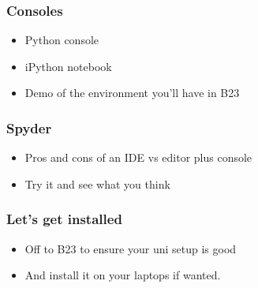 \documentclass{beamer}
\begin{document}
\begin{frame}
\frametitle{Consoles}
\begin{itemize}
\item Python console 
\item iPython notebook
\item Demo of the environment you'll have in B23
\end{itemize}
\end{frame}


\begin{frame}
\frametitle{Spyder}
\begin{itemize}
\item Pros and cons of an IDE vs editor plus console
\item Try it and see what you think
\end{itemize}
\end{frame}



\begin{frame}
\frametitle{Let's get installed}
\begin{itemize}
\item Off to B23 to ensure your uni setup is good 
\item And install it on your laptops if wanted.
\end{itemize}
\end{frame}
\end{document}
